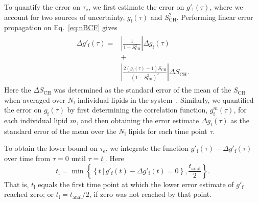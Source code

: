 \documentclass[journal=jpcbfk,manuscript=article,layout=twocolumn]{achemso}
\begin{document}
To quantify the error on $\tau_\mathrm e$, we first estimate the error on $g'_\mathrm f(\tau)$,%
where we account for two sources of uncertainty, $g_{\mathrm{f}}(\tau)$ and $S^2_\mathrm{CH}$.
%
Performing linear error propagation on Eq.~\eqref{eq:nBCF} gives
\begin{align}
\begin{split}
\label{eq:error}
\Delta g'_{\mathrm{f}}(\tau)
=
&\left|
	\frac{1}{1-S^2_\mathrm{CH}}
\right|
\Delta g_{\mathrm{f}}(\tau)\\
&+\\
&\left|
	\frac{2\left(g_\mathrm{f}(\tau)-1\right)S_\mathrm{CH}}{\left(1-S^2_\mathrm{CH}\right)^2}
\right|
\Delta S_\mathrm{CH}.
\end{split}
\end{align}
Here the $\Delta S_\mathrm{CH}$ was determined %
as the standard error of the mean of the $S_\mathrm{CH}$
when averaged over $N_\mathrm l$ individual lipids in the system~\cite{botan15}.
%
Similarly, we quantified the error on $g_{\mathrm{f}}(\tau)$
by first determining the correlation function, $g^m_{\mathrm{f}}(\tau)$,
for each individual lipid $m$, %
and then obtaining the error estimate
$\Delta g_{\mathrm{f}}(\tau)$
as the standard error of the mean over the $N_\mathrm l$ lipids
%
for each time point $\tau$.

To obtain the lower bound on $\tau_\mathrm e$, we integrate the function
$g'_{\mathrm{f}}(\tau) - \Delta g'_{\mathrm{f}}(\tau)$ over time from $\tau=0$ until $\tau=t_\mathrm l$.
Here
\begin{equation}
t_\mathrm l= \min
\left\{
	\left\{
		t\,|\,g'_{\mathrm{f}}(t) - \Delta g'_{\mathrm{f}}(t) = 0
	\right\},
	\frac{t_\mathrm{anal}}{2}
\right\}.
\end{equation}
That is,
$t_\mathrm l$ equals
the first time point at which the lower error estimate of $g'_\mathrm f$ reached zero;
or $t_\mathrm l=t_\mathrm{anal}/2$, if zero was not reached by that point.
\end{document}
